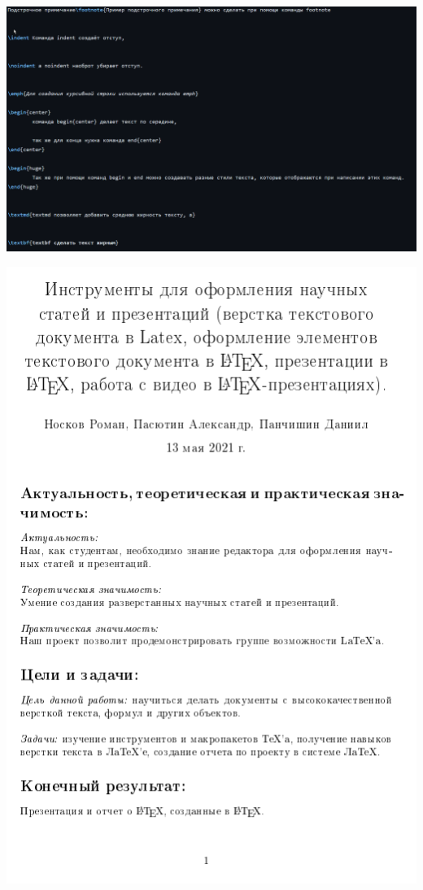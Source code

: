 \documentclass{article}
\begin{document}
	
	\includegraphics{4}
	
	
	\includegraphics{5}
	
\end{document}
